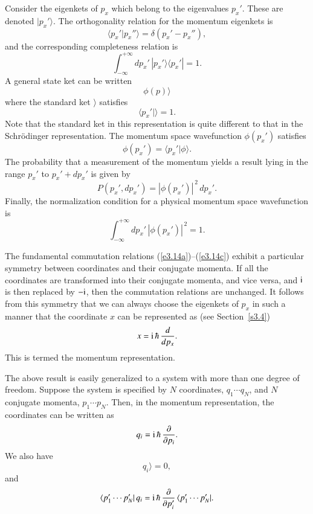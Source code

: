 Consider the eigenkets of $p_x$ which belong to the eigenvalues $p_x'$. These are
denoted $|p_x'\rangle$. The orthogonality relation for the momentum eigenkets is
\begin{equation}\label{e3.69}
\langle p_x'|p_x''\rangle = \delta(p_x'-p_x''),
\end{equation}
and the corresponding completeness relation is
\begin{equation}\label{e3.70}
\int_{-\infty}^{+\infty} dp_x'\, |p_x'\rangle \langle p_x'| = 1.
\end{equation}
A general state ket can be written
\begin{equation}
\phi(p)\rangle
\end{equation}
where the standard ket $\rangle $  satisfies 
\begin{equation}
\langle p_x'| \rangle = 1.
\end{equation}
Note that the standard ket in this representation is quite
different to that  in the Schr\"{o}dinger representation. 
The momentum space wavefunction $\phi(p_x')$ satisfies
\begin{equation}
\phi(p_x') = \langle p_x'|\phi \rangle.
\end{equation}
The probability that a measurement of the momentum yields a result
lying  in the range $p_x'$ to
$p_x'+dp_x'$ is given by
\begin{equation}
P(p_x', dp_x') = |\phi(p_x')|^{\,2}\,dp_x'.
\end{equation}
Finally, the normalization condition for a physical momentum space wavefunction is
\begin{equation}
\int_{-\infty}^{+\infty}dp_x'\, |\phi(p_x')|^{\,2} = 1.
\end{equation}

The fundamental commutation relations (\ref{e3.14a})--(\ref{e3.14c}) exhibit a 
particular symmetry between coordinates and their conjugate momenta. If all the
coordinates are transformed into their conjugate momenta, and {\rm vice versa}, and
$\rm i$ is  then replaced by $-\rm i$,  then the commutation relations are
unchanged. It follows from this symmetry that we can always choose the eigenkets
of $p_x$ in such a manner that  the coordinate 
$x$ can be represented as (see Section~\ref{s3.4})
\begin{equation}
x = {\rm i}\,\hbar\, \frac{d}{dp_x}.
\end{equation}
This is termed the momentum representation. 

The above result is easily generalized to a system with more than one degree of
freedom. Suppose the system is specified by $N$ coordinates, $q_1\cdots q_N$, and
$N$ conjugate momenta, $p_1\cdots p_N$. Then, in the momentum representation, the
coordinates can be written as 
\begin{equation}
q_i = {\rm i}\,\hbar\, \frac{\partial}{\partial p_i}.
\end{equation}
We also have
\begin{equation}
q_i \rangle = 0,
\end{equation}
and
\begin{equation}
\langle p_1' \cdots p_N'|\, q_i = {\rm i}\,\hbar \,\frac{\partial}{\partial p_i'}\,
\langle p_1'\cdots p_N'|.
\end{equation}


